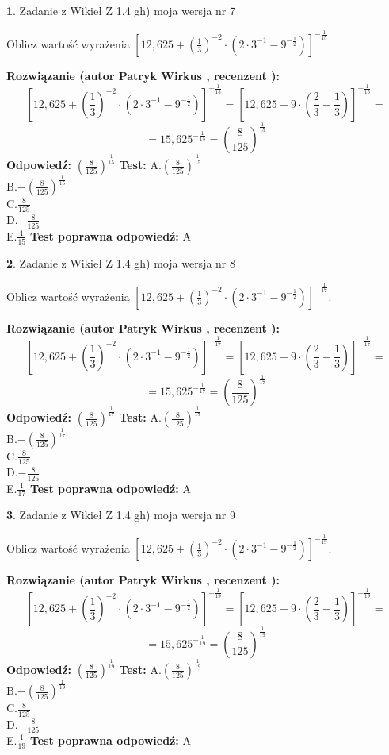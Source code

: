 \documentclass[12pt, a4paper]{article}
\theoremstyle{definition} %
\newtheorem{zad}{}
\newcommand{\zadStart}[1]{\begin{zad}#1\newline}
\newcommand{\zadStop}{\end{zad}}
\newcommand{\rozwStart}[2]{\noindent \textbf{Rozwiązanie (autor #1 , recenzent #2): }\newline}
\newcommand{\rozwStop}{\newline}
\newcommand{\odpStart}{\noindent \textbf{Odpowiedź:}\newline}
\newcommand{\odpStop}{\newline}
\newcommand{\testStart}{\noindent \textbf{Test:}\newline}
\newcommand{\testStop}{\newline}
\newcommand{\kluczStart}{\noindent \textbf{Test poprawna odpowiedź:}\newline}
\newcommand{\kluczStop}{\newline}
\begin{document}
\zadStart{Zadanie z Wikieł Z 1.4 gh) moja wersja nr 7}

Oblicz wartość wyrażenia $[12,625+(\frac{1}{3})^{-2}\cdot(2\cdot 3^{-1} - 9^{-\frac{1}{2}})]^{-\frac{1}{15}}$.
\zadStop
\rozwStart{Patryk Wirkus}{}
$$[12,625+(\frac{1}{3})^{-2}\cdot(2\cdot 3^{-1} - 9^{-\frac{1}{2}})]^{-\frac{1}{15}} = [12,625+9\cdot (\frac{2}{3}-\frac{1}{3})]^{-\frac{1}{15}} =$$
$$=15,625^{-\frac{1}{15}} = (\frac{8}{125})^\frac{1}{15}$$
\rozwStop
\odpStart
$(\frac{8}{125})^\frac{1}{15}$
\odpStop
\testStart
A.$(\frac{8}{125})^\frac{1}{15}$\\ B.$-(\frac{8}{125})^\frac{1}{15}$\\ C.$\frac{8}{125}$\\ D.$-\frac{8}{125}$\\ E.$\frac{1}{15}$
\testStop
\kluczStart
A
\kluczStop



\zadStart{Zadanie z Wikieł Z 1.4 gh) moja wersja nr 8}

Oblicz wartość wyrażenia $[12,625+(\frac{1}{3})^{-2}\cdot(2\cdot 3^{-1} - 9^{-\frac{1}{2}})]^{-\frac{1}{17}}$.
\zadStop
\rozwStart{Patryk Wirkus}{}
$$[12,625+(\frac{1}{3})^{-2}\cdot(2\cdot 3^{-1} - 9^{-\frac{1}{2}})]^{-\frac{1}{17}} = [12,625+9\cdot (\frac{2}{3}-\frac{1}{3})]^{-\frac{1}{17}} =$$
$$=15,625^{-\frac{1}{17}} = (\frac{8}{125})^\frac{1}{17}$$
\rozwStop
\odpStart
$(\frac{8}{125})^\frac{1}{17}$
\odpStop
\testStart
A.$(\frac{8}{125})^\frac{1}{17}$\\ B.$-(\frac{8}{125})^\frac{1}{17}$\\ C.$\frac{8}{125}$\\ D.$-\frac{8}{125}$\\ E.$\frac{1}{17}$
\testStop
\kluczStart
A
\kluczStop



\zadStart{Zadanie z Wikieł Z 1.4 gh) moja wersja nr 9}

Oblicz wartość wyrażenia $[12,625+(\frac{1}{3})^{-2}\cdot(2\cdot 3^{-1} - 9^{-\frac{1}{2}})]^{-\frac{1}{19}}$.
\zadStop
\rozwStart{Patryk Wirkus}{}
$$[12,625+(\frac{1}{3})^{-2}\cdot(2\cdot 3^{-1} - 9^{-\frac{1}{2}})]^{-\frac{1}{19}} = [12,625+9\cdot (\frac{2}{3}-\frac{1}{3})]^{-\frac{1}{19}} =$$
$$=15,625^{-\frac{1}{19}} = (\frac{8}{125})^\frac{1}{19}$$
\rozwStop
\odpStart
$(\frac{8}{125})^\frac{1}{19}$
\odpStop
\testStart
A.$(\frac{8}{125})^\frac{1}{19}$\\ B.$-(\frac{8}{125})^\frac{1}{19}$\\ C.$\frac{8}{125}$\\ D.$-\frac{8}{125}$\\ E.$\frac{1}{19}$
\testStop
\kluczStart
A
\kluczStop
\end{document}
